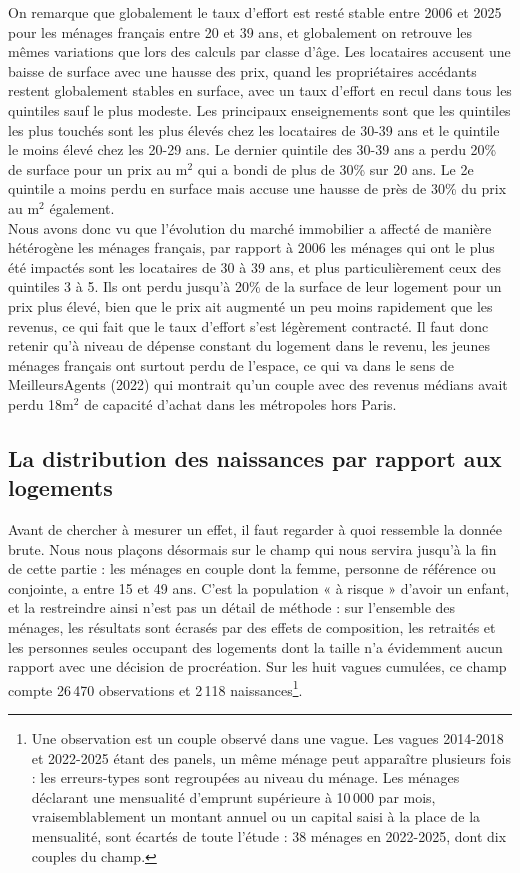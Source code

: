 \documentclass[12pt,a4paper]{article}
\begin{document}
\bigskip

\noindent On remarque que globalement le taux d'effort est resté stable entre 2006 et 2025 pour les ménages français entre 20 et 39 ans, et globalement on retrouve les mêmes variations que lors des calculs par classe d'âge. Les locataires accusent une baisse de surface avec une hausse des prix, quand les propriétaires accédants restent globalement stables en surface, avec un taux d'effort en recul dans tous les quintiles sauf le plus modeste. Les principaux enseignements sont que les quintiles les plus touchés sont les plus élevés chez les locataires de 30-39 ans et le quintile le moins élevé chez les 20-29 ans. Le dernier quintile des 30-39 ans a perdu 20\% de surface pour un prix au m$^2$ qui a bondi de plus de 30\% sur 20 ans. Le 2e quintile a moins perdu en surface mais accuse une hausse de près de 30\% du prix au m$^2$ également. \\

\noindent Nous avons donc vu que l'évolution du marché immobilier a affecté de manière hétérogène les ménages français, par rapport à 2006 les ménages qui ont le plus été impactés sont les locataires de 30 à 39 ans, et plus particulièrement ceux des quintiles 3 à 5. Ils ont perdu jusqu'à 20\% de la surface de leur logement pour un prix plus élevé, bien que le prix ait augmenté un peu moins rapidement que les revenus, ce qui fait que le taux d'effort s'est légèrement contracté. Il faut donc retenir qu'à niveau de dépense constant du logement dans le revenu, les jeunes ménages français ont surtout perdu de l'espace, ce qui va dans le sens de MeilleursAgents (2022) qui montrait qu'un couple avec des revenus médians avait perdu 18m$^2$ de capacité d'achat dans les métropoles hors Paris.   

\subsection{La distribution des naissances par rapport aux logements}

Avant de chercher à mesurer un effet, il faut regarder à quoi ressemble la donnée brute. Nous nous plaçons désormais sur le champ qui nous servira jusqu'à la fin de cette partie : les ménages en couple dont la femme, personne de référence ou conjointe, a entre 15 et 49 ans. C'est la population « à risque » d'avoir un enfant, et la restreindre ainsi n'est pas un détail de méthode : sur l'ensemble des ménages, les résultats sont écrasés par des effets de composition, les retraités et les personnes seules occupant des logements dont la taille n'a évidemment aucun rapport avec une décision de procréation. Sur les huit vagues cumulées, ce champ compte 26\,470 observations et 2\,118 naissances\footnote{Une observation est un couple observé dans une vague. Les vagues 2014-2018 et 2022-2025 étant des panels, un même ménage peut apparaître plusieurs fois : les erreurs-types sont regroupées au niveau du ménage. Les ménages déclarant une mensualité d'emprunt supérieure à 10\,000 \texteuro{} par mois, vraisemblablement un montant annuel ou un capital saisi à la place de la mensualité, sont écartés de toute l'étude : 38 ménages en 2022-2025, dont dix couples du champ.}. \\
\end{document}
